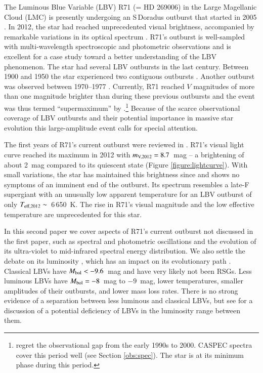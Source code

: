 \documentclass[structabstract]{aa}
\begin{document}
The Luminous Blue Variable (LBV) R71 (= HD 269006) in the Large Magellanic Cloud (LMC) is presently undergoing an S\,Doradus outburst that started in 2005 \citep{2009IAUC.9082....1G}. In 2012, the star had reached unprecedented visual brightness, accompanied by remarkable variations in its optical spectrum \citep{2012CBET.3192....1G,2013A&A...555A.116M}. R71's outburst is well-sampled with multi-wavelength spectroscopic and photometric observations and  is excellent for a case study toward a better understanding of the LBV phenomenon. The star had several LBV outbursts in the last century. Between 1900 and 1950 the star experienced two contiguous outbursts \citep{2012IAUS..285...29G,2017AJ....154...15W}. Another outburst was observed between 1970--1977 \citep{1974MNRAS.168..221T,1975A&A....41..471W,1979A&AS...38..151V,1981A&A...103...94W,1982A&A...112...61V}. Currently, R71 reached $V$ magnitudes of more than one magnitude brighter than during these previous outbursts and the event was thus termed ``supermaximum'' by \citet{2017AJ....154...15W}.\footnote{\citet{2017AJ....154...15W} regret the observational gap from the early 1990s to 2000. CASPEC spectra cover this period well (see Section \ref{obs:spec}). The star is at its minimum phase during this period.}
Because of the scarce observational coverage of LBV outbursts and their potential importance in massive star evolution this large-amplitude event calls for special attention.

The first years of R71's current outburst were reviewed in \citet{2013A&A...555A.116M}. R71's visual light curve reached its maximum in 2012 with $m_{\textnormal{\scriptsize{V,2012}}} = 8.7$~mag -- a brightening of about 2~mag compared to its quiescent state (Figure \ref{figure:lightcurve}). With small variations, the star has maintained this brightness since and shows no symptoms of an imminent end of the outburst.  Its spectrum resembles a late-F supergiant with an unusually low apparent temperature for an LBV outburst of only $T_{\textnormal{\scriptsize{eff,2012}}} \sim$~6\,650~K. The rise in R71's visual magnitude and the low effective temperature are unprecedented for this star. 

In this second paper we cover aspects of R71's current outburst not discussed in the first paper, such as spectral and photometric oscillations and the evolution of its ultra-violet to mid-infrared spectral energy distribution. We also settle the debate on its luminosity \citep{1993SSRv...66..207L,1981A&A...103...94W}, which has an impact on its evolutionary path \citep{1994PASP..106.1025H}. Classical LBVs have $M_{\textnormal{\scriptsize{bol}}} < -9.6$~mag and have very likely not been RSGs. Less luminous LBVs have $M_{\textnormal{\scriptsize{bol}}} = -8$~mag to $-9$~mag, lower temperatures, smaller amplitudes of their outbursts, and lower mass loss rates. There is no strong evidence of a separation between less luminous and classical LBVs, but see \citet{2004ApJ...615..475S} for a discussion of a potential deficiency of LBVs in the luminosity range between them. 
\end{document}
